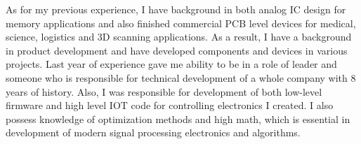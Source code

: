 


As for my previous experience, I have background in both analog IC design for memory applications and also finished commercial PCB level devices for medical, science, logistics and 3D scanning applications. As a result, I have a background in product development and have developed components and devices in various projects.
Last year of experience gave me ability to be in a role of leader and someone who is responsible for technical development of a whole company with 8 years of history.
Also, I was responsible for development of both low-level firmware and high level IOT code for controlling electronics I created. I also possess knowledge of optimization methods and high math, which is essential in development of modern signal processing electronics and algorithms.


